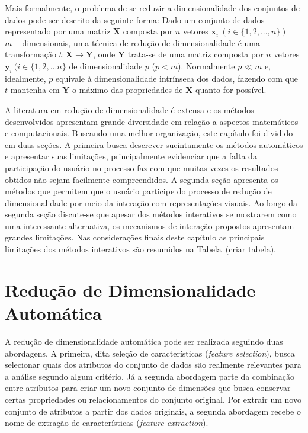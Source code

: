 Mais formalmente, o problema de se reduzir a dimensionalidade dos conjuntos de dados pode ser descrito da seguinte forma: 
Dado um conjunto de dados representado por uma matriz $\textbf{X}$ composta por $n$ vetores $\textbf{x}_i~(i \in \{1,2,...,n\})$ $m-$dimensionais, uma técnica de redução de dimensionalidade é uma transformação $t: \textbf{X} \rightarrow \textbf{Y}$, onde $\textbf{Y}$ trata-se de uma matriz composta por $n$ vetores $\textbf{y}_i~(i \in \{1,2,...n\}$ de dimensionalidade $p$ ($p < m$). 
Normalmente $p \ll m$ e, idealmente, $p$ equivale à dimensionalidade intrínseca dos dados, fazendo com que $t$ mantenha em $\textbf{Y}$ o máximo das propriedades de $\textbf{X}$ quanto for possível. 

A literatura em redução de dimensionalidade é extensa e os métodos desenvolvidos apresentam grande diversidade em relação a aspectos matemáticos e computacionais. 
Buscando uma melhor organização, este capítulo foi dividido em duas seções. 
A primeira busca descrever sucintamente os métodos automáticos e apresentar suas limitações, principalmente evidenciar que a falta da participação do usuário no processo faz com que muitas vezes os resultados obtidos não sejam facilmente compreendidos. 
A segunda seção apresenta os métodos que permitem que o usuário participe do processo de redução de dimensionalidade por meio da interação com representações visuais. Ao longo da segunda seção discute-se que apesar dos métodos interativos se mostrarem como uma interessante alternativa, os mecanismos de interação propostos apresentam grandes limitações. Nas considerações finais deste capítulo as principais limitações dos métodos interativos são resumidos na Tabela~(criar tabela). 

\section{Redução de Dimensionalidade Automática}

A redução de dimensionalidade automática pode ser realizada seguindo duas abordagens. 
A primeira, dita seleção de características (\emph{feature selection}), busca selecionar quais dos atributos do conjunto de dados são realmente relevantes para a análise segundo algum critério. 
Já a segunda abordagem parte da combinação entre atributos para criar um novo conjunto de dimensões que busca conservar certas propriedades ou relacionamentos do conjunto original. 
Por extrair um novo conjunto de atributos a partir dos dados originais, a segunda abordagem recebe o nome de extração de características (\emph{feature extraction}).

